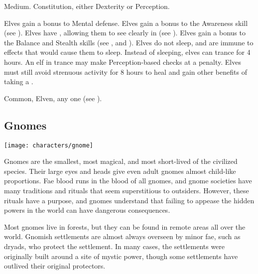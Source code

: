          Medium.
          Constitution, either  Dexterity or  Perception.
        \begin{raggeditemize}
             Elves gain a  bonus to Mental defense.
             Elves gain a  bonus to the Awareness skill (see ).
             Elves have , allowing them to see clearly in  (see ).
             Elves gain a  bonus to the Balance and Stealth skills (see , and ).
             Elves do not sleep, and are immune to \magical effects that would cause them to sleep.
                Instead of sleeping, elves can trance for 4 hours.
                An elf in trance may make Perception-based checks at a  penalty.
                Elves must still avoid strenuous activity for 8 hours to heal and gain other benefits of taking a .
        \end{raggeditemize}
         Common, Elven, any one  (see ).

    \subsection{Gnomes}
        \texttt{[image: characters/gnome]}

        Gnomes are the smallest, most magical, and most short-lived of the civilized species.
        Their large eyes and heads give even adult gnomes almost child-like proportions.
        Fae blood runs in the blood of all gnomes, and gnome societies have many traditions and rituals that seem superstitious to outsiders.
        However, these rituals have a purpose, and gnomes understand that failing to appease the hidden powers in the world can have dangerous consequences.

        Most gnomes live in forests, but they can be found in remote areas all over the world.
        Gnomish settlements are almost always overseen by minor fae, such as dryads, who protect the settlement.
        In many cases, the settlements were originally built around a site of mystic power, though some settlements have outlived their original protectors.

